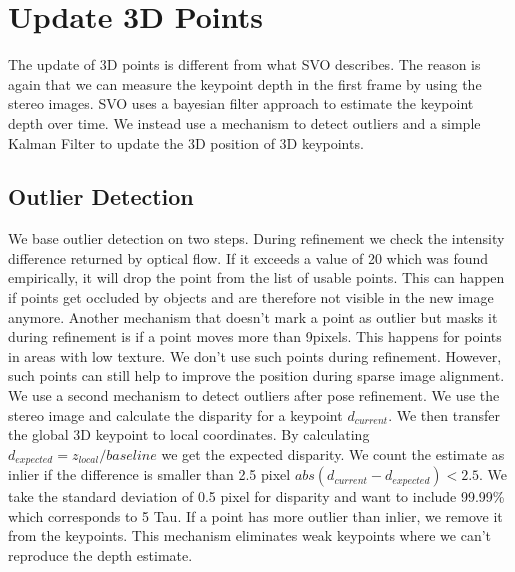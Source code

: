 \documentclass[11pt,a4paper,titlepage,oneside]{report}
\begin{document}
\section{Update 3D Points}

The update of 3D points is different from what SVO \cite{svo} describes. The reason is again that we can measure the keypoint depth in the first frame by using the stereo images. SVO uses a bayesian filter approach \cite{svo} to estimate the keypoint depth over time. We instead use a mechanism to detect outliers and a simple Kalman Filter to update the 3D position of 3D keypoints.

\subsection{Outlier Detection}
We base outlier detection on two steps. During refinement we check the intensity difference returned by optical flow. If it exceeds a value of 20 which was found empirically, it will drop the point from the list of usable points. This can happen if points get occluded by objects and are therefore not visible in the new image anymore. Another mechanism that doesn't mark a point as outlier but masks it during refinement is if a point moves more than 9pixels. This happens for points in areas with low texture. We don't use such points during refinement. However, such points can still help to improve the position during sparse image alignment.\\
We use a second mechanism to detect outliers after pose refinement. We use the stereo image and calculate the disparity for a keypoint $d_{current}$. We then transfer the global 3D keypoint to local coordinates. By calculating $d_{expected}=z_{local}/baseline$ we get the expected disparity. We count the estimate as inlier if the difference is smaller than 2.5 pixel $abs(d_{current}-d_{expected})<2.5$. We take the standard deviation of 0.5 pixel for disparity and want to include 99.99\% which corresponds to 5 Tau. If a point has more outlier than inlier, we remove it from the keypoints. This mechanism eliminates weak keypoints where we can't reproduce the depth estimate.
\end{document}
